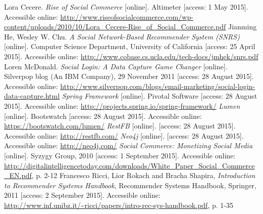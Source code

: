 \documentclass[12pt]{report}
\begin{document}


\begin{thebibliography}{99}
Lora Cecere. \textit{Rise of Social Commerce} [online]. Altimeter [access: 1 May 2015]. Accessible online: \url{http://www.riseofsocialcommerce.com/wp-content/uploads/2010/10/Lora_Cecere-Rise_of_Social_Commerce.pdf}
Jianming He, Wesley W. Chu. \textit{A Social Network-Based Recommender System (SNRS)} [online]. Computer Science Department, University of California [access: 25 April 2015]. Accessible online: \url{http://www.cobase.cs.ucla.edu/tech-docs/jmhek/snrs.pdf}
Loren McDonald. \textit{Social Login: A Data Capture Game Changer} [online]. Silverpop blog (An IBM Company), 29 November 2011 [access: 28 August 2015]. Accessible online: \url{http://www.silverpop.com/blogs/email-marketing/social-login-data-capture.html}
\textit{Spring Framework} [online]. Pivotal Software [access: 28 August 2015]. Accessible online: \url{http://projects.spring.io/spring-framework/}
\textit{Lumen} [online]. Bootswatch [access: 28 August 2015]. Accessible online: \url{https://bootswatch.com/lumen/}
\textit{RestFB} [online]. [access: 28 August 2015]. Accessible online: \url{http://restfb.com/}
\textit{Neo4j} [online]. [access: 28 August 2015]. Accessible online: \url{http://neo4j.com/}
\textit{Social Commerce: Monetizing Social Media} [online]. Syzygy Group, 2010 [access: 1 September 2015]. Accessible online: \url{http://digitalintelligencetoday.com/downloads/White_Paper_Social_Commerce_EN.pdf}, p. 2-12
Francesco Ricci, Lior Rokach and Bracha Shapira, \textit{Introduction to Recommender Systems Handbook}, Recommender Systems Handbook, Springer, 2011 [access: 2 September 2015]. Accessible online: \url{http://www.inf.unibz.it/~ricci/papers/intro-rec-sys-handbook.pdf}, p. 1-35

\end{thebibliography}
\end{document}
